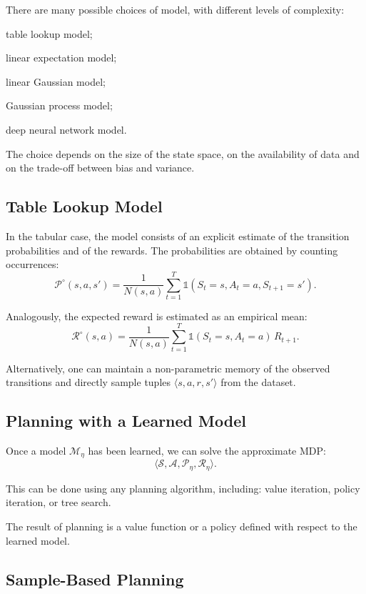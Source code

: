 There are many possible choices of model, with different levels of complexity:
\begin{compactitemize}
    \item table lookup model;
    \item linear expectation model;
    \item linear Gaussian model;
    \item Gaussian process model;
    \item deep neural network model.
\end{compactitemize}

The choice depends on the size of the state space, on the availability of data and on the trade-off between bias and variance.

\subsection{Table Lookup Model}

In the tabular case, the model consists of an explicit estimate of the transition probabilities and of the rewards.
The probabilities are obtained by counting occurrences:
\[
\mathcal{P}^\circ(s,a,s')
=
\frac{1}{N(s,a)}
\sum_{t=1}^{T}
\mathbb{1}(S_t=s, A_t=a, S_{t+1}=s').
\]

Analogously, the expected reward is estimated as an empirical mean:
\[
\mathcal{R}^\circ(s,a)
=
\frac{1}{N(s,a)}
\sum_{t=1}^{T}
\mathbb{1}(S_t=s, A_t=a)\,R_{t+1}.
\]

Alternatively, one can maintain a non-parametric memory of the observed transitions
and directly sample tuples $\langle s,a,r,s' \rangle$ from the dataset.

\subsection{Planning with a Learned Model}

Once a model $\mathcal{M}_\eta$ has been learned, we can solve the approximate MDP:
\[
\langle \mathcal{S}, \mathcal{A}, \mathcal{P}_\eta, \mathcal{R}_\eta \rangle.
\]

This can be done using any planning algorithm, including:
value iteration, policy iteration, or tree search.

The result of planning is a value function or a policy defined with respect to the learned model.

\subsection{Sample-Based Planning}

